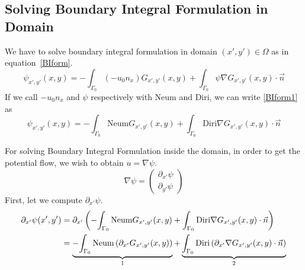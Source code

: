 \documentclass[a4paper,12pt]{article}
\newcommand{\integ}[3]{%
\ensuremath{\displaystyle{\int^{#2}_{#1} #3}}}
\begin{document}
\subsection{Solving Boundary Integral Formulation in Domain}

We have to solve boundary integral formulation in domain $(x',y')\in \Omega$ as in equation~\eqref{BIform}. 
\begin{equation}
 \psi_{x',y'}(x,y)=-\integ{\Gamma_0}{}{(-u_0 n_x)G_{x',y'}(x,y)} + \integ{\Gamma_0}{}{\psi\nabla G_{x',y'}(x,y)\cdot \vec{n}} \label{BIform1}
\end{equation}
If we call $-u_0 n_x$ and $\psi$ respectively with Neum and Diri, we can write \ref{BIform1} as
\begin{equation}
 \psi_{x',y'}(x,y)=-\integ{\Gamma_0}{}{\text{Neum}G_{x',y'}(x,y)} + \integ{\Gamma_0}{}{\text{Diri}\nabla G_{x',y'}(x,y)\cdot \vec{n}}
\end{equation}

For solving Boundary Integral Formulation inside the domain, in order to get the potential flow, we wish to obtain $u=\nabla\psi$.
\begin{equation}
 \nabla\psi=\left(\begin{array}{c}
      \partial_{x'}\psi \\
      \partial_{y'}\psi
    \end{array}\right)
\end{equation}
First, let we compute $\partial_{x'}\psi$.
\begin{align}
 \partial_{x'}\psi(x',y')&=\partial_{x'}\left(-\integ{\Gamma_0}{}{\text{Neum}G_{x',y'}(x,y)} + \integ{\Gamma_0}{}{\text{Diri}\nabla G_{x',y'}(x,y)\cdot \vec{n}} \right)\\
&=  \underbrace{-\integ{\Gamma_0}{}{\text{Neum} \left(\partial_{x'}G_{x',y'}(x,y)\right)}}_\text{1}  +  
\underbrace{\integ{\Gamma_0}{}{\text{Diri}\left(\partial_{x'}\nabla G_{x',y'}(x,y)\cdot \vec{n}\right)}}_\text{2} 
\end{align}
\end{document}
